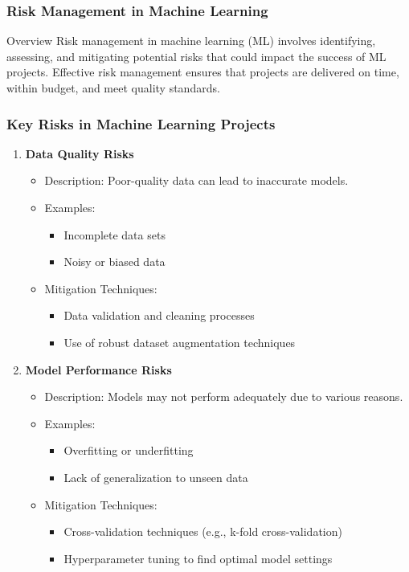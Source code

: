 \documentclass[aspectratio=169]{beamer}
\begin{document}
\begin{frame}[fragile]
    \frametitle{Risk Management in Machine Learning}
    \begin{block}{Overview}
        Risk management in machine learning (ML) involves identifying, assessing, and mitigating potential risks that could impact the success of ML projects.
        Effective risk management ensures that projects are delivered on time, within budget, and meet quality standards.
    \end{block}
\end{frame}

\begin{frame}[fragile]
    \frametitle{Key Risks in Machine Learning Projects}
    \begin{enumerate}
        \item \textbf{Data Quality Risks}
        \begin{itemize}
            \item Description: Poor-quality data can lead to inaccurate models.
            \item Examples:
            \begin{itemize}
                \item Incomplete data sets
                \item Noisy or biased data
            \end{itemize}
            \item Mitigation Techniques:
            \begin{itemize}
                \item Data validation and cleaning processes
                \item Use of robust dataset augmentation techniques
            \end{itemize}
        \end{itemize}
        
        \item \textbf{Model Performance Risks}
        \begin{itemize}
            \item Description: Models may not perform adequately due to various reasons.
            \item Examples:
            \begin{itemize}
                \item Overfitting or underfitting
                \item Lack of generalization to unseen data
            \end{itemize}
            \item Mitigation Techniques:
            \begin{itemize}
                \item Cross-validation techniques (e.g., k-fold cross-validation)
                \item Hyperparameter tuning to find optimal model settings
            \end{itemize}
        \end{itemize}
    \end{enumerate}
\end{frame}
\end{document}
